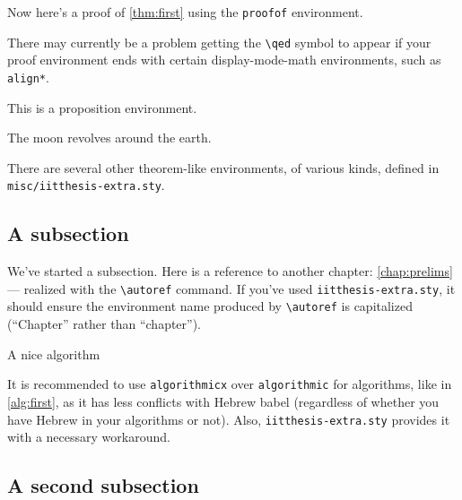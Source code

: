 Now here's a proof of \autoref{thm:first} using the \verb|proofof| environment.
\begin{proofof}
\lipsum[3]
\end{proofof}

\begin{note}There may currently be a problem getting the \verb|\qed| symbol to appear if your proof environment ends with certain display-mode-math environments, such as \verb|align*|.
\end{note}

\begin{proposition}
\label{prop:first}
This is a proposition environment. 
\end{proposition}

\begin{observation}
\label{obs:first}
The moon revolves around the earth.
\end{observation}

There are several other theorem-like environments, of various kinds, defined in \texttt{misc/iitthesis-extra.sty}.

\subsection{A subsection}

We've started a subsection. Here is a reference to another chapter: \autoref{chap:prelims} --- realized with the \verb|\autoref| command. If you've used \texttt{iitthesis-extra.sty}, it should ensure the environment name produced by \verb|\autoref| is capitalized (``Chapter'' rather than ``chapter'').

\begin{algorithm}
\caption{A nice algorithm}
\label{alg:first}
\begin{algorithmic}[1]
\ENDFOR
{}
\end{algorithmic}
\end{algorithm}

It is recommended to use \texttt{algorithmicx} over \texttt{algorithmic} for algorithms, like in \autoref{alg:first}, as it has less conflicts with Hebrew babel (regardless of whether you have Hebrew in your algorithms or not). Also, \texttt{iitthesis-extra.sty} provides it with a necessary workaround.

\subsection{A second subsection}

